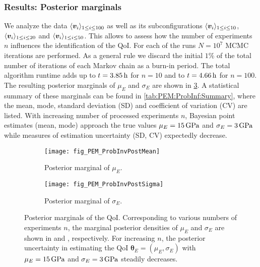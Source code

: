 \subsubsection{Results: Posterior marginals}
We analyze the data \(\langle{\bm{v}_i}\rangle_{1\leq i \leq 100}\) as well as its subconfigurations \(\langle{\bm{v}_i}\rangle_{1 \leq i \leq 10}\), \(\langle{\bm{v}_i}\rangle_{1\leq i \leq 20}\) and \(\langle{\bm{v}_i}\rangle_{1\leq i \leq 50}\).
This allows to assess how the number of experiments \(n\) influences the identification of the QoI.
For each of the runs \(N=10^7\) MCMC iterations are performed.
As a general rule we discard the initial \(\unit{1}{\%}\) of the total number of iterations of each Markov chain as a burn-in period.
The total algorithm runtime adds up to \(t=\unit[3.85]{h}\) for \(n=10\) and to \(t=\unit[4.66]{h}\) for \(n=100\).
The resulting posterior marginals of \(\mu_E\) and \(\sigma_E\) are shown in \cref{fig:PEM:ProbInv:Marginals}.
A statistical summary of these marginals can be found in \cref{tab:PEM:ProbInf:Summary}, where the mean, mode, standard deviation (SD) and coefficient of variation (CV) are listed.
With increasing number of processed experiments \(n\),
Bayesian point estimates (mean, mode) approach the true values \(\mu_E = \unit[15]{GPa}\) and \(\sigma_E = \unit[3]{GPa}\) while measures of estimation uncertainty (SD, CV) expectedly decrease.
\begin{figure}[ht]
  \centering
  \begin{subfigure}[b]{0.5\textwidth}
    \centering
    \texttt{[image: fig\_PEM\_ProbInvPostMean]}
    \caption{Posterior marginal of \(\mu_E\).}
    \label{fig:PEM:ProbInv:Post:Mean}
  \end{subfigure}%
  \begin{subfigure}[b]{0.5\textwidth}
    \centering
    \texttt{[image: fig\_PEM\_ProbInvPostSigma]}
    \caption{Posterior marginal of \(\sigma_E\).}
    \label{fig:PEM:ProbInv:Post:Sigma}
  \end{subfigure}%
  \caption[Posterior marginals of the QoI]{Posterior marginals of the QoI.
           Corresponding to various numbers of experiments \(n\), the marginal posterior densities of \(\mu_E\) and \(\sigma_E\)
           are shown in  and , respectively.
           For increasing \(n\), the posterior uncertainty in estimating the QoI \(\bm{\theta}_E = (\mu_E,\sigma_E)\)
           with \(\mu_E=\unit[15]{GPa}\) and \(\sigma_E = \unit[3]{GPa}\) steadily decreases.
          }
  \label{fig:PEM:ProbInv:Marginals}
\end{figure}
